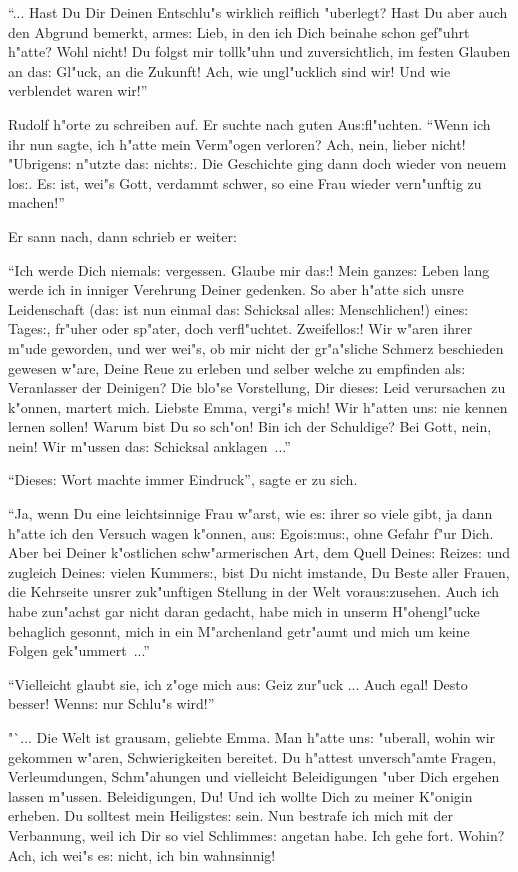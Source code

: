 \documentclass[oneside,12pt]{book}
\newcommand{\s}{s:}%
\begin{document}
"`... Hast Du Dir Deinen Entschlu"s wirklich reiflich "uberlegt?
Hast Du aber auch den Abgrund bemerkt, arme{\s} Lieb, in den ich
Dich beinahe schon gef"uhrt h"atte? Wohl nicht! Du folgst mir
tollk"uhn und zuversichtlich, im festen Glauben an da{\s} Gl"uck,
an die Zukunft! Ach, wie ungl"ucklich sind wir! Und wie verblendet
waren wir!"'

Rudolf h"orte zu schreiben auf. Er suchte nach guten
Au{\s}fl"uchten. "`Wenn ich ihr nun sagte, ich h"atte mein
Verm"ogen verloren? Ach, nein, lieber nicht! "Ubrigen{\s} n"utzte
da{\s} nicht{\s}. Die Geschichte ging dann doch wieder von neuem
lo{\s}. E{\s} ist, wei"s Gott, verdammt schwer, so eine Frau
wieder vern"unftig zu machen!"'

Er sann nach, dann schrieb er weiter:

"`Ich werde Dich niemal{\s} vergessen. Glaube mir da{\s}! Mein
ganze{\s} Leben lang werde ich in inniger Verehrung Deiner
gedenken. So aber h"atte sich unsre Leidenschaft (da{\s} ist nun
einmal da{\s} Schicksal alle{\s} Menschlichen!) eine{\s} Tage{\s},
fr"uher oder sp"ater, doch verfl"uchtet. Zweifello{\s}! Wir w"aren
ihrer m"ude geworden, und wer wei"s, ob mir nicht der gr"a"sliche
Schmerz beschieden gewesen w"are, Deine Reue zu erleben und selber
welche zu empfinden al{\s} Veranlasser der Deinigen? Die blo"se
Vorstellung, Dir diese{\s} Leid verursachen zu k"onnen, martert
mich. Liebste Emma, vergi"s mich! Wir h"atten un{\s} nie kennen
lernen sollen! Warum bist Du so sch"on! Bin ich der Schuldige? Bei
Gott, nein, nein! Wir m"ussen da{\s} Schicksal anklagen~..."'

"`Diese{\s} Wort machte immer Eindruck"', sagte er zu sich.

"`Ja, wenn Du eine leichtsinnige Frau w"arst, wie e{\s} ihrer so
viele gibt, ja dann h"atte ich den Versuch wagen k"onnen, au{\s}
Egoi{\s}mu{\s}, ohne Gefahr f"ur Dich. Aber bei Deiner k"ostlichen
schw"armerischen Art, dem Quell Deine{\s} Reize{\s} und zugleich
Deine{\s} vielen Kummer{\s}, bist Du nicht imstande, Du Beste
aller Frauen, die Kehrseite unsrer zuk"unftigen Stellung in der
Welt vorau{\s}zusehen. Auch ich habe zun"achst gar nicht daran
gedacht, habe mich in unserm H"ohengl"ucke behaglich gesonnt, mich
in ein M"archenland getr"aumt und mich um keine Folgen
gek"ummert~..."'

"`Vielleicht glaubt sie, ich z"oge mich au{\s} Geiz zur"uck ...
Auch egal! Desto besser! Wenn{\s} nur Schlu"s wird!"'

"`... Die Welt ist grausam, geliebte Emma. Man h"atte un{\s}
"uberall, wohin wir gekommen w"aren, Schwierigkeiten bereitet. Du
h"attest unversch"amte Fragen, Verleumdungen, Schm"ahungen und
vielleicht Beleidigungen "uber Dich ergehen lassen m"ussen.
Beleidigungen, Du! Und ich wollte Dich zu meiner K"onigin erheben.
Du solltest mein Heiligste{\s} sein. Nun bestrafe ich mich mit der
Verbannung, weil ich Dir so viel Schlimme{\s} angetan habe. Ich
gehe fort. Wohin? Ach, ich wei"s e{\s} nicht, ich bin wahnsinnig!
\end{document}
